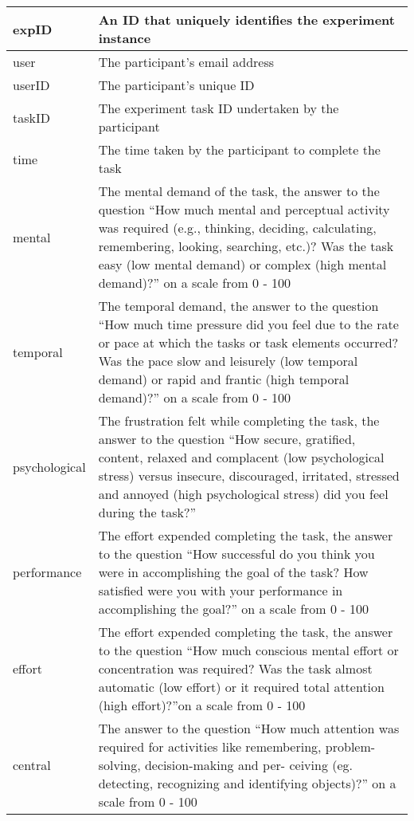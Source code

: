 \begin{table}[]
\centering
\begin{tabular}{|l|p{10cm}|}
\hline
 expID & An ID that uniquely identifies the experiment instance \\ \hline
 user & The participant's email address \\ \hline
 userID & The participant's unique ID \\ \hline
 taskID & The experiment task ID undertaken by the participant \\ \hline
 time & The time taken by the participant to complete the task \\ \hline
 mental & The mental demand of the task, the answer to the question ``How much mental and perceptual activity was required (e.g., thinking, deciding, calculating, remembering, looking, searching, etc.)? Was the task easy (low mental demand) or complex (high mental demand)?'' on a scale from 0 - 100 \\ \hline
 temporal & The temporal demand, the answer to the question ``How much time pressure did you feel due to the rate or pace at which the tasks or task elements occurred? Was the pace slow and leisurely (low temporal demand) or rapid and frantic (high temporal demand)?'' on a scale from 0 - 100\\ \hline
psychological & The frustration felt while  completing the task, the answer to the question ``How secure, gratified, content, relaxed and complacent (low psychological stress) versus insecure, discouraged, irritated, stressed and annoyed (high psychological stress) did you feel during the task?'' \\ \hline
 performance & The effort expended completing the task, the answer to the question ``How successful do you think you were in accomplishing the goal of the task? How satisfied were you with your performance in accomplishing the goal?'' on a scale from 0 - 100 \\ \hline
 effort & The effort expended completing the task, the answer to the question ``How much conscious mental effort or concentration was required? Was the task almost automatic (low effort) or it required total attention (high effort)?''on a scale from 0 - 100 \\ \hline
central & The answer to the question ``How much attention was required for activities like remembering, problem-solving, decision-making and per- ceiving (eg. detecting, recognizing and identifying objects)?'' on a scale from 0 - 100 \\ \hline

\end{tabular}
\end{table}
